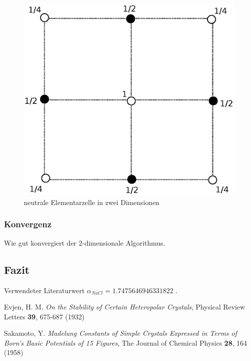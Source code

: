 \documentclass[10pt,a4paper]{article}
\begin{document}
\begin{figure}[h]
	\centering
	\includegraphics[scale = 0.4]{./figures/quadrat.eps}
	\caption{neutrale Elementarzelle in zwei Dimensionen}
	\label{skalierungsgrafik2d}
\end{figure}

\subsubsection{Konvergenz}

Wie gut konvergiert der 2-dimensionale Algorithmus.

\subsection{Fazit}

Verwendeter Literaturwert $\alpha_{NaCl} = 1.7475646946331822$ \cite{Sakamoto} .


\begin{thebibliography}{9}

Evjen, H. M.
\emph{On the Stability of Certain Heteropolar Crystals},
Physical Review Letters \textbf{39},
675-687 (1932)

Sakamoto, Y.
\emph{Madelung Constants of Simple Crystals Expressed in Terms of Born's Basic
Potentials of 15 Figures},
The Journal of Chemical Physics \textbf{28},
164 (1958)

\end{thebibliography}
\end{document}
